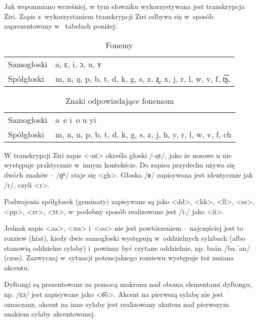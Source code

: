 \begin{spacing}{1.1}
Jak wspomniano wcześniej, w tym słowniku wykorzystywana jest transkrypcja Ziri. 
Zapis z~wykorzystaniem transkrypcji Ziri odbywa się w~sposób zaprezentowany w~
tabelach poniżej:

\begin{table}[h]
	\centering
	\caption{Fonemy}
	\begin{tabular}{ll} \toprule
		Samogłoski & a, ɛ, i, ɔ, u, ʏ \\
		Spółgłoski & m, n, ŋ, p, b, t, d, k, g, s, z, ʐ, x, j, r, l, w, v, f, t͡ʂ, \\\bottomrule
	\end{tabular}
	\label{tab:phonemes}
\end{table}

\begin{table}[h]
\centering
\caption{Znaki odpowiadające fonemom}
\begin{tabular}{ll} \toprule
	Samogłoski & a~e i~o u yi \\
	Spółgłoski & m, n, n, p, b, t, d, k, g, s, z, j, h, y, r, l, w, v, f, ch \\\bottomrule
\end{tabular}
\label{tab:chars}
\end{table}

W transkrypcji Ziri zapis <-nt> określa głoski /-ŋt/, jako że nosowe n nie 
występuje praktycznie w~innym kontekście. Do zapisu przydechu używa się dwóch 
znaków -- /ɡʱ/ staje się <gh>. Głoska /ʁ/ zapisywana jest identycznie jak /r/, 
czyli <r>.

\skipline

Podwojenia spółgłosek (geminaty) zapisywane są jako <dd>, <kk>, <ll>, <ss>, 
<pp>, <rr>, <tt>, w~podobny sposób realizowane jest /i:/ jako <ii>.

Jednak zapis <aa>, <uu> i~<oo> nie jest powtórzeniem -- najczęściej jest to 
rozziew (hiat), kiedy dwie samogłoski występują w~oddzielnych sylabach (albo 
stanowią oddzielne sylaby) i~powinny być czytane oddzielnie, np. baán /ba.ˈan/
 (czas). Zazwyczaj w~sytuacji potencjalnego rozziewu występuje też zmiana 
 akcentu.

Dyftongi są prezentowane za pomocą makronu nad oboma elementami dyftongu, np.
/ɛɔ/ jest zapisywane jako <e͞o>. Akcent na pierwszą sylabę nie jest oznaczany, 
akcent na inne sylaby jest realizowany akutem nad pierwszym znakiem sylaby 
akcentowanej.


\end{spacing}
